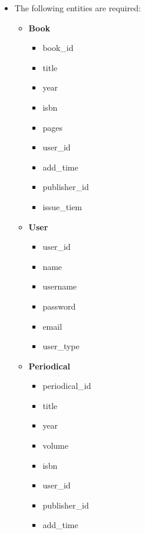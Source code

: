 \documentclass{article}
\begin{document}
\begin{itemize}
    \item The following entities are required:
        \begin{itemize}
            \item \textbf{Book}
                \begin{itemize}
                    \item {\color{blue}book\_id}
                    \item title
                    \item year
                    \item isbn
                    \item pages
                    \item {\color{red}user\_id}
                    \item add\_time
                    \item {\color{red}publisher\_id}
                    \item issue\_tiem
                \end{itemize}
            \item \textbf{User}
                \begin{itemize}
                    \item {\color{blue}user\_id}
                    \item name
                    \item username
                    \item password
                    \item email
                    \item {\color{green}user\_type}
                \end{itemize}
            \item \textbf{Periodical}
                \begin{itemize}
                    \item {\color{blue}periodical\_id}
                    \item title
                    \item year
                    \item volume
                    \item isbn
                    \item {\color{red}user\_id}
                    \item {\color{red}publisher\_id}
                    \item add\_time

\end{itemize}
\end{itemize}
\end{itemize}
\end{document}
